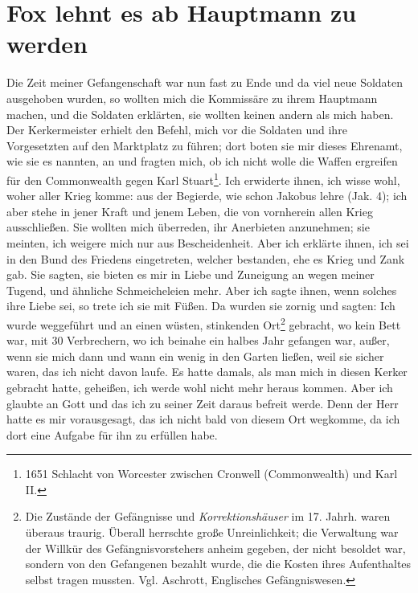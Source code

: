 \section{Fox lehnt es ab Hauptmann zu werden}

Die Zeit meiner Gefangenschaft war nun fast zu Ende und
da viel neue Soldaten ausgehoben wurden, so wollten mich die
Kommissäre zu ihrem Hauptmann machen, und die Soldaten
erklärten, sie wollten keinen andern als mich haben. Der 
Kerkermeister erhielt den Befehl, mich vor die Soldaten und ihre 
Vorgesetzten auf den Marktplatz zu führen; dort boten sie mir dieses
Ehrenamt, wie sie es nannten, an und fragten mich, ob ich nicht
wolle die Waffen ergreifen für den Commonwealth gegen Karl
Stuart\footnote{1651 Schlacht von Worcester 
zwischen Cronwell 
(Commonwealth) und Karl II.}. 
Ich erwiderte ihnen, ich wisse wohl, woher aller
Krieg komme: aus der Begierde, wie schon Jakobus lehre
(Jak. 4); ich aber stehe in jener 
Kraft und jenem Leben,
die von vornherein allen Krieg ausschließen. Sie wollten mich
überreden, ihr Anerbieten anzunehmen; sie meinten, ich weigere
mich nur aus Bescheidenheit. Aber ich erklärte ihnen, ich sei in
den Bund des Friedens eingetreten, welcher bestanden, ehe es
Krieg und Zank gab. Sie sagten, sie bieten es mir in Liebe und
Zuneigung an wegen meiner Tugend, und ähnliche Schmeicheleien
mehr. Aber ich sagte ihnen, wenn solches ihre Liebe sei, so trete
ich sie mit Füßen. Da wurden sie zornig und sagten:  Ich wurde weggeführt und
an einen wüsten, stinkenden Ort\footnote{Die Zustände der 
Gefängnisse und \textit{Korrektionshäuser} im 17. Jahrh.
waren überaus traurig. Überall herrschte große Unreinlichkeit; 
die Verwaltung war der Willkür des Gefängnisvorstehers 
anheim gegeben, der nicht besoldet war, sondern von den 
Gefangenen bezahlt wurde, die die Kosten ihres Aufenthaltes 
selbst tragen mussten. Vgl. Aschrott, Englisches Gefängniswesen.
} gebracht, wo kein Bett war,
mit 30 Verbrechern, wo ich beinahe ein halbes Jahr gefangen
war, außer, wenn sie mich dann und wann ein wenig in den
Garten ließen, weil sie sicher waren, das ich nicht davon laufe.
Es hatte damals, als man mich in diesen Kerker gebracht hatte,
geheißen, ich werde wohl nicht mehr heraus kommen. Aber ich
glaubte an Gott und das ich zu seiner 
Zeit daraus befreit werde.
Denn der Herr hatte es mir vorausgesagt, das ich nicht bald
von diesem Ort wegkomme, da ich dort eine Aufgabe für ihn zu
erfüllen habe.



